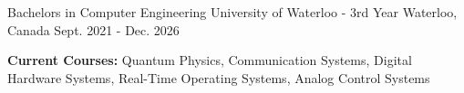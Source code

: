 

\begin{cventries}

	\cventry
	{Bachelors in Computer Engineering} %
	{University of Waterloo - 3rd Year} %
	{Waterloo, Canada} %
	{Sept. 2021 - Dec. 2026} %
	{
		\begin{cvitems} %
			\item {\textbf{Current Courses:} Quantum Physics, Communication Systems, Digital Hardware Systems, Real-Time Operating Systems, Analog Control Systems}
		\end{cvitems}
	}

\end{cventries}
